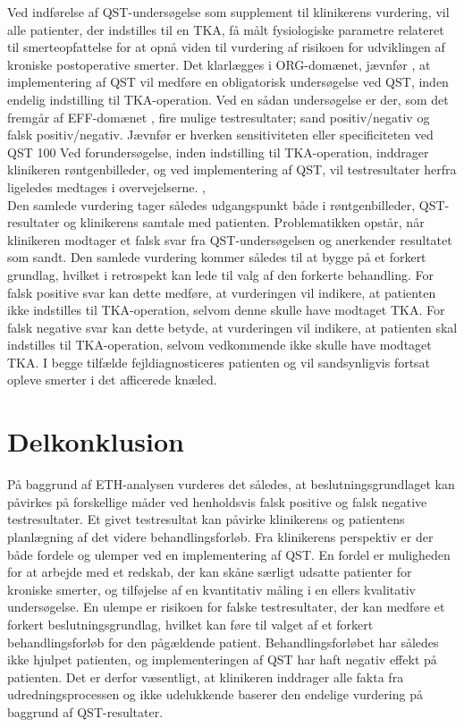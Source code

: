 Ved indførelse af QST-undersøgelse som supplement til klinikerens vurdering, vil alle patienter, der indstilles til en TKA, få målt fysiologiske parametre relateret til smerteopfattelse for at opnå viden til vurdering af risikoen for udviklingen af kroniske postoperative smerter. 
Det klarlægges i ORG-domænet, jævnfør , at implementering af QST vil medføre en obligatorisk undersøgelse ved QST, inden endelig indstilling til TKA-operation. Ved en sådan undersøgelse er der, som det fremgår af EFF-domænet , fire mulige testresultater; sand positiv/negativ og falsk positiv/negativ. Jævnfør  er hverken sensitiviteten eller specificiteten ved QST 100%
Ved forundersøgelse, inden indstilling til TKA-operation, inddrager klinikeren røntgenbilleder, og ved implementering af QST, vil testresultater herfra ligeledes medtages i overvejelserne. \citep{pritka2016},  \\
Den samlede vurdering tager således udgangspunkt både i røntgenbilleder, QST-resultater og klinikerens samtale med patienten. Problematikken opstår, når klinikeren modtager et falsk svar fra QST-undersøgelsen og anerkender resultatet som sandt. Den samlede vurdering kommer således til at bygge på et forkert grundlag, hvilket i retrospekt kan lede til valg af den forkerte behandling. 
For falsk positive svar kan dette medføre, at vurderingen vil indikere, at patienten ikke indstilles til TKA-operation, selvom denne skulle have modtaget TKA.
For falsk negative svar kan dette betyde, at vurderingen vil indikere, at patienten skal indstilles til TKA-operation, selvom vedkommende ikke skulle have modtaget TKA.
I begge tilfælde fejldiagnosticeres patienten og vil sandsynligvis fortsat opleve smerter i det afficerede knæled.


\section{Delkonklusion}
På baggrund af ETH-analysen vurderes det således, at beslutningsgrundlaget kan påvirkes på forskellige måder ved henholdsvis falsk positive og falsk negative testresultater. Et givet testresultat kan påvirke klinikerens og patientens planlægning af det videre behandlingsforløb. 
Fra klinikerens perspektiv er der både fordele og ulemper ved en implementering af QST. En fordel er muligheden for at arbejde med et redskab, der kan skåne særligt udsatte patienter for kroniske smerter, og tilføjelse af en kvantitativ måling i en ellers kvalitativ undersøgelse. En ulempe er risikoen for falske testresultater, der kan medføre et forkert beslutningsgrundlag, hvilket kan føre til valget af et forkert behandlingsforløb for den pågældende patient. Behandlingsforløbet har således ikke hjulpet patienten, og implementeringen af QST har haft negativ effekt på patienten. Det er derfor væsentligt, at klinikeren inddrager alle fakta fra udredningsprocessen og ikke udelukkende baserer den endelige vurdering på baggrund af QST-resultater.